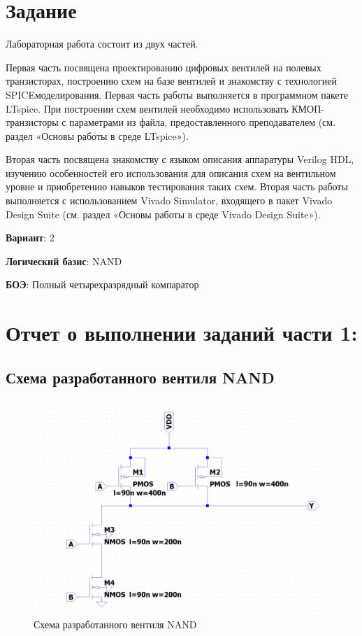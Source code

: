 \documentclass[12pt,onecolumn]{article}
\begin{document}
\section{Задание}
Лабораторная работа состоит из двух частей.

Первая часть посвящена проектированию цифровых вентилей на полевых транзисторах, построению схем на базе вентилей и знакомству с технологией SPICEмоделирования. Первая часть работы выполняется в программном пакете LTspice. При построении схем вентилей необходимо использовать КМОП-транзисторы с параметрами из файла, предоставленного преподавателем (см. раздел «Основы работы в среде LTspice»).

Вторая часть посвящена знакомству с языком описания аппаратуры Verilog HDL, изучению особенностей его использования для описания схем на вентильном уровне и приобретению навыков тестирования таких схем. Вторая часть работы выполняется с использованием Vivado Simulator, входящего в пакет Vivado Design Suite (см. раздел «Основы работы в среде Vivado Design Suite»).

\textbf{Вариант}: 2

\textbf{Логический базис}: NAND

\textbf{БОЭ}: Полный четырехразрядный компаратор

\section{Отчет о выполнении заданий части 1:}
\subsection{Схема разработанного вентиля NAND}
\begin{figure}[H]
    \centering
    \includegraphics[scale=0.5]{image/ventil.png}
    \caption{Схема разработанного вентиля NAND}
\end{figure}
\end{document}
